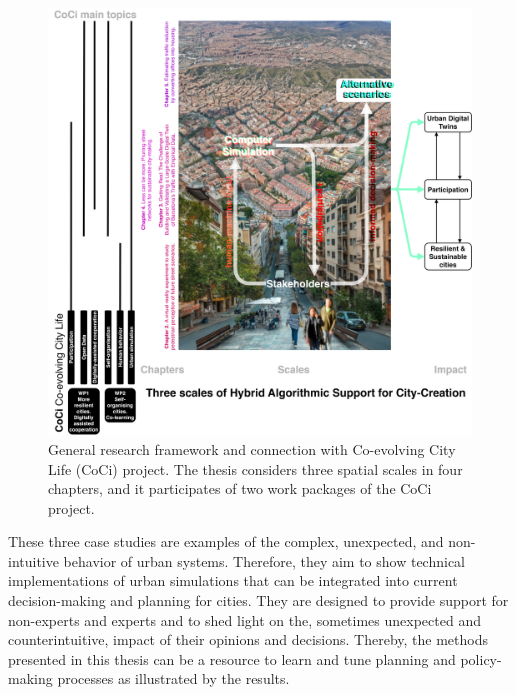\begin{figure}[htbp!]
    \centering
    \includegraphics[width=1\textwidth]{chapters/00_introduction/figures/inception_01_v01.jpg}
    \captionsetup{format=plain, justification=centering} %
    \caption{General research framework and connection with Co-evolving City Life (CoCi) project. The thesis considers three spatial scales in four chapters, and it participates of two work packages of the CoCi project.}
   \label{fig:inception}
\end{figure}

These three case studies are examples of the complex, unexpected, and non-intuitive behavior of urban systems. Therefore, they aim to show technical implementations of urban simulations that can be integrated into current decision-making and planning for cities. They are designed to provide support for non-experts and experts and to shed light on the, sometimes unexpected and counterintuitive, impact of their opinions and decisions. Thereby, the methods presented in this thesis can be a resource to learn and tune planning and policy-making processes as illustrated by the results. 
 

